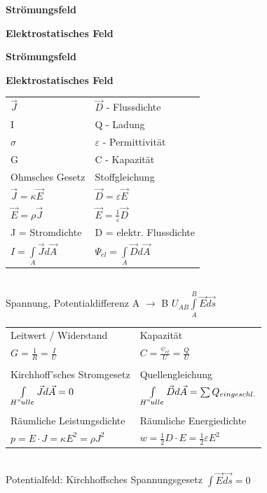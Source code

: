 \begin{minipage}{3.5cm}
	\textbf{Strömungsfeld}
\end{minipage}
\begin{minipage}{6.1cm}
		\textbf{Elektrostatisches Feld}
\end{minipage}
\begin{minipage}{4.5cm}
	\textbf{Strömungsfeld} 
\end{minipage}
\begin{minipage}{4cm}
	\textbf{Elektrostatisches Feld}
\end{minipage}
\begin{multicols}{2}
\begin{tabular}{l|l}
$ \vec{J} $ & $ \vec{D} $ - Flussdichte \\
I & Q - Ladung\\
$ \sigma $ & $ \varepsilon $ - Permittivität \\
G & C - Kapazität \\
Ohmsches Gesetz & Stoffgleichung \\
$ \vec J = \kappa \vec E $ & $ \vec D = \varepsilon \vec E $ \\
$ \vec E = \rho \vec J $ & $ \vec E = \frac{1}{\varepsilon} \vec D $ \\
J = Stromdichte & D = elektr. Flussdichte \\
$I = \int\limits_{A} \vec J d \vec A$ & $ \Psi_{el} = \int\limits_{A} \vec D d \vec A $ \
\end{tabular}
\\
Spannung, Potentialdifferenz A $\rightarrow$ B  $U_{AB} \int\limits_{A}^B \vec E \vec{ds}$ \\
\columnbreak

\begin{tabular}{l|l}
Leitwert / Widerstand & Kapazität \\
$ G = \frac{1}{R} = \frac{I}{U} $ &  $ C = \frac{\psi_{el}}{U} = \frac{Q}{U} $ \\
\\
Kirchhoff'sches Stromgesetz & Quellengleichung \\
$\int\limits_{H"ulle} \vec J d \vec A = 0$ & $\int\limits_{H"ulle} \vec D d \vec A = \sum Q_{eingeschl.}$ \\
\\
Räumliche Leistungsdichte & Räumliche 
Energiedichte \\
$ p = E \cdot J = \kappa E^2 = \rho J^2 $ & $ w = \frac{1}{2} D \cdot E = \frac{1}{2} \varepsilon E^2 $ \\
\end{tabular}\\
Potentialfeld: Kirchhoffsches Spannungsgesetz $\int \vec E \vec{ds} = 0 $ \\
\end{multicols}

